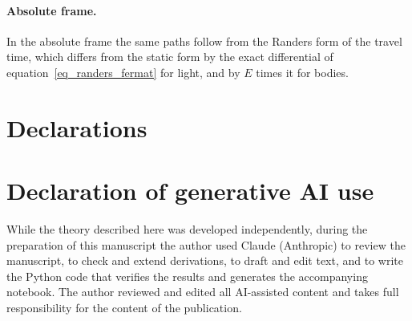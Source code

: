 \documentclass{iopjournal}
\begin{document}
\begin{appendices}
\paragraph{Absolute frame.} In the absolute frame the same paths follow from the Randers form of the travel time, which differs from the static form by the exact differential of equation~\eqref{eq_randers_fermat} for light, and by $E$ times it for bodies.

\end{appendices}

\section*{Declarations}




\section*{Declaration of generative AI use}
While the theory described here was developed independently, during the preparation of this manuscript the author used Claude (Anthropic) to review the manuscript, to check and extend derivations, to draft and edit text, and to write the Python code that verifies the results and generates the accompanying notebook. The author reviewed and edited all AI-assisted content and takes full responsibility for the content of the publication.

\printbibliography
\end{document}
